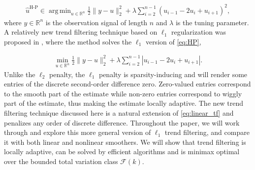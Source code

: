 \documentclass[a4paper]{article}
\DeclareMathOperator*{\argmin}{arg\,min}
\newcommand{\RR}{\mathbb{R}}
\renewcommand{\cal}{\mathcal}
\begin{document}
\begin{align}
\hat{u}^{\text{H-P}} \in \argmin_{u\in\RR^n} \frac{1}{2}\|y-u\|_2^2 +\lambda\sum_{i=2}^{n-1}(u_{i-1}-2u_i+u_{i+1})^2,
\label{eq:HP}
\end{align}
where $y\in\RR^n$ is the observation signal of length $n$ and $\lambda$ is the tuning parameter. A relatively new trend filtering technique based on $\ell_1$ regularization was proposed in \cite{kim2009ell_1}, where the method solves the $\ell_1$ version of \eqref{eq:HP},

\begin{align}
\min_{u\in\RR^n} \frac{1}{2}\|y-u\|_2^2 + \lambda\sum_{i=2}^{n-1} |u_{i-1} - 2u_i + u_{i+1}|. \label{eq:linear_tf}
\end{align}
Unlike the $\ell_2$ penalty, the $\ell_1$ penalty is sparsity-inducing and will render some entries of the discrete second-order difference zero. Zero-valued entries correspond to the smooth part of the estimate while non-zero entries correspond to wiggly part of the estimate, thus making the estimate locally adaptive. The new trend filtering technique discussed here is a natural extension of \eqref{eq:linear_tf} and penalizes any order of discrete difference. Throughout the paper, we will work through and explore this more general version of $\ell_1$ trend filtering, and compare it with both linear and nonlinear smoothers. We will show that trend filtering is locally adaptive, can be solved by efficient algorithms and is minimax optimal over the bounded total variation class $\cal{F}(k)$.
\end{document}
